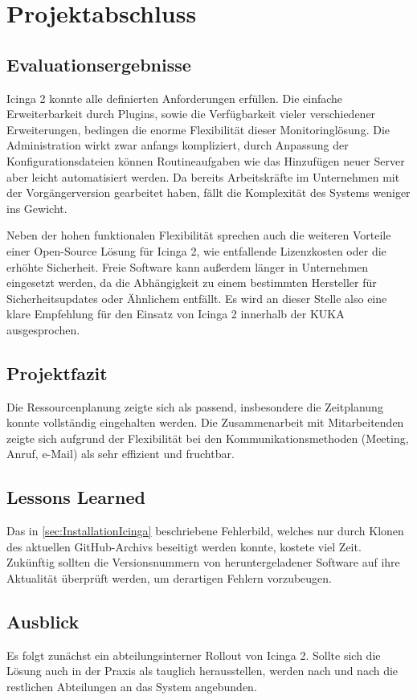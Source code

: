 \section{Projektabschluss} 
\label{sec:projektabschluss}

\subsection{Evaluationsergebnisse}
\label{sec:Evaluationsergebnisse}
\glqq{}Icinga 2\grqq{} konnte alle definierten Anforderungen erfüllen. Die einfache Erweiterbarkeit durch Plugins, sowie die Verfügbarkeit vieler verschiedener Erweiterungen, bedingen die enorme Flexibilität dieser Monitoringlösung. Die Administration wirkt zwar anfangs kompliziert, durch Anpassung der Konfigurationsdateien können Routineaufgaben wie das Hinzufügen neuer Server aber leicht automatisiert werden. Da bereits Arbeitskräfte im Unternehmen mit der Vorgängerversion gearbeitet haben, fällt die Komplexität des Systems weniger ins Gewicht.

Neben der hohen funktionalen Flexibilität sprechen auch die weiteren Vorteile einer Open-Source Lösung für \glqq{}Icinga 2\grqq{}, wie entfallende Lizenzkosten oder die erhöhte Sicherheit. Freie Software kann außerdem länger in Unternehmen eingesetzt werden, da die Abhängigkeit zu einem bestimmten Hersteller für Sicherheitsupdates oder Ähnlichem entfällt. Es wird an dieser Stelle also eine klare Empfehlung für den Einsatz von \glqq{}Icinga 2\grqq{} innerhalb der KUKA ausgesprochen.

\subsection{Projektfazit}
\label{sec:Projektfazit}
Die Ressourcenplanung zeigte sich als passend, insbesondere die Zeitplanung konnte vollständig eingehalten werden. Die Zusammenarbeit mit Mitarbeitenden zeigte sich aufgrund der Flexibilität bei den Kommunikationsmethoden (Meeting, Anruf, e-Mail) als sehr effizient und fruchtbar.

\subsection{Lessons Learned}
\label{sec:LessonsLearned}
Das in \ref{sec:InstallationIcinga}  beschriebene Fehlerbild, welches nur durch Klonen des aktuellen GitHub-Archivs beseitigt werden konnte, kostete viel Zeit. Zukünftig sollten die Versionsnummern von heruntergeladener Software auf ihre Aktualität überprüft werden, um derartigen Fehlern vorzubeugen.

\subsection{Ausblick}
\label{sec:Ausblick}
Es folgt zunächst ein abteilungsinterner Rollout von \glqq{}Icinga 2\grqq{}. Sollte sich die Lösung auch in der Praxis als tauglich herausstellen, werden nach und nach die restlichen Abteilungen an das System angebunden.